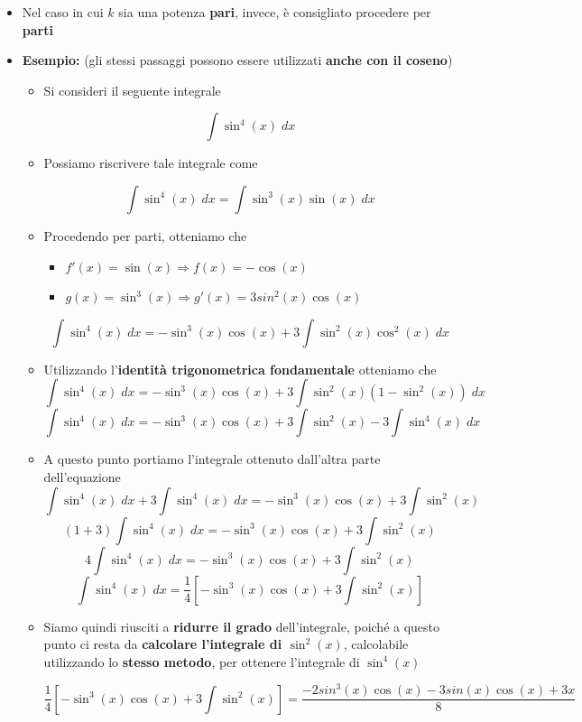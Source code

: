 \documentclass[a4paper, 12pt]{report}
\begin{document}
\begin{itemize}
        \item Nel caso in cui $k$ sia una potenza \textbf{pari}, invece, è consigliato procedere per \textbf{parti}
        
        \item \textbf{Esempio:} (gli stessi passaggi possono essere utilizzati \textbf{anche con il coseno})
        
        \begin{itemize}
            \item Si consideri il seguente integrale
            
            \[ \int \sin^4(x) \; dx\]
            
            \item Possiamo riscrivere tale integrale come
            
            \[ \int \sin^4(x) \; dx = \int \sin^3(x) \sin(x) \; dx\]
            
            \item Procedendo per parti, otteniamo che
            
            \begin{itemize}
                \item $f'(x) = \sin(x) \Longrightarrow f(x) = -\cos(x)$
                \item $g(x) = \sin^3(x) \Longrightarrow g'(x) = 3sin^2(x)\cos(x)$
            \end{itemize}
            
            \[ \int \sin^4(x) \; dx = -\sin^3(x)\cos(x)+3\int \sin^2(x)\cos^2(x) \; dx\]
            
            \item Utilizzando l'\textbf{identità trigonometrica fondamentale} otteniamo che
            \[ \int \sin^4(x) \; dx = -\sin^3(x)\cos(x)+3\int \sin^2(x)(1-\sin^2(x)) \; dx\]
            \[ \int \sin^4(x) \; dx = -\sin^3(x)\cos(x)+3\int \sin^2(x) - 3 \int \sin^4(x) \; dx\]
            
            \item A questo punto portiamo l'integrale ottenuto dall'altra parte dell'equazione
            \[ \int \sin^4(x) \; dx + 3 \int \sin^4(x) \; dx = -\sin^3(x)\cos(x)+3\int \sin^2(x)\]
            \[ (1+3)\int \sin^4(x) \; dx = -\sin^3(x)\cos(x)+3\int \sin^2(x)\]
            \[ 4 \int \sin^4(x) \; dx = -\sin^3(x)\cos(x)+3\int \sin^2(x)\]
            \[ \int \sin^4(x) \; dx = \frac{1}{4} \left [ -\sin^3(x)\cos(x)+3\int \sin^2(x) \right ]\]
            
            \item Siamo quindi riusciti a \textbf{ridurre il grado} dell'integrale, poiché a questo punto ci resta da \textbf{calcolare l'integrale di $\sin^2(x)$}, calcolabile utilizzando lo \textbf{stesso metodo}, per ottenere l'integrale di $\sin^4(x)$
            
            \[ \frac{1}{4} \left [ -\sin^3(x)\cos(x)+3\int \sin^2(x) \right ] = \frac{-2sin^3(x)\cos(x)-3sin(x)\cos(x)+3x}{8}\]
        \end{itemize}
    \end{itemize}
    
\end{document}
